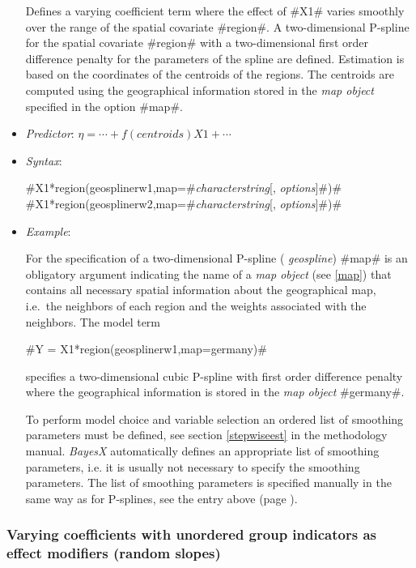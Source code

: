\begin{itemize}
Defines a varying coefficient term where the effect of #X1# varies
smoothly over the range of the spatial covariate #region#.
A two-dimensional P-spline for the spatial covariate
#region# with a two-dimensional first order difference penalty
for the parameters of the spline are defined. Estimation is based on the
coordinates of the centroids of the regions. The centroids are
computed using the geographical information stored in the {\em map
object} specified in the option #map#.
\item[] {\em Predictor}:
$\eta= \cdots + f(centroids) X1 + \cdots$ \item[] {\em Syntax}:

#X1*region(geosplinerw1,map=#{\em characterstring}[, {\em options}]#)# \\
#X1*region(geosplinerw2,map=#{\em characterstring}[, {\em options}]#)#
\item[] {\em Example}:

For the specification of a two-dimensional P-spline ({\em
geospline}) #map# is an obligatory argument indicating the name of
a {\em map object} (see \autoref{map}) that contains all necessary
spatial information about the geographical map, i.e.~the neighbors
of each region and the weights associated with the neighbors. The
model term

#Y = X1*region(geosplinerw1,map=germany)#

specifies a two-dimensional cubic P-spline with first order
difference penalty where the geographical information is stored in the
{\em map object} #germany#.

To perform model choice and variable selection an ordered list of smoothing parameters must be defined, see section
\autoref{stepwiseest}
in the methodology manual. {\em BayesX} automatically defines an appropriate list of smoothing parameters, i.e. it
is usually not necessary to  specify the smoothing parameters.
The list of smoothing parameters is specified manually in the same way as for P-splines,
see the entry above (page \pageref{psplines_stepwise}).
\end{itemize}



\subsubsection*{Varying coefficients with unordered group indicators
as effect modifiers (random slopes)}

